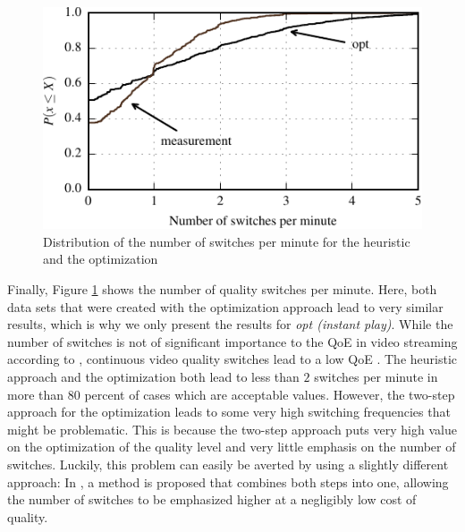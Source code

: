 \begin{figure}[t]
\centering
\includegraphics[width=\columnwidth]{figs/switches_py}%
\caption{Distribution of the number of switches per minute for the heuristic and the optimization}
\label{fig:switches}%
\end{figure}

Finally, Figure \ref{fig:switches} shows the number of quality switches per minute. Here, both data sets that were created with the optimization approach lead to very similar results, which is why we only present the results for \textit{opt (instant play)}. While the number of switches is not of significant importance to the QoE in video streaming according to \cite{seufert2015survey}, continuous video quality switches lead to a low QoE \cite{liu2013user}. The heuristic approach and the optimization both lead to less than $2$ switches per minute in more than $80$ percent of cases which are acceptable values. However, the two-step approach for the optimization leads to some very high switching frequencies that might be problematic. This is because the two-step approach puts very high value on the optimization of the quality level and very little emphasis on the number of switches. Luckily, this problem can easily be averted by using a slightly different approach: In \cite{liotou2016enriching}, a method is proposed that combines both steps into one, allowing the number of switches to be emphasized higher at a negligibly low cost of quality.

